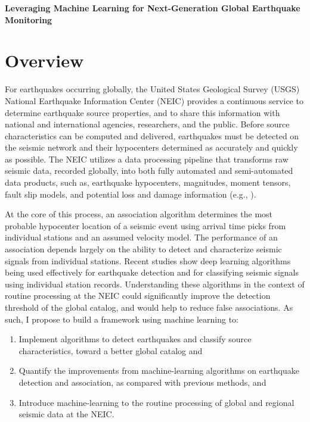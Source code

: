 \documentclass[12p]{article}
\begin{document}
\begin{center}\Large\textbf{Leveraging Machine Learning for Next-Generation Global Earthquake Monitoring}\end{center}

\section*{Overview}
For earthquakes occurring globally, the United States Geological Survey (USGS) National Earthquake Information Center (NEIC) provides a continuous service to determine earthquake source properties, and to share this information with national and international agencies, researchers, and the public. Before source characteristics can be computed and delivered, earthquakes must be detected on the seismic network and their hypocenters determined as accurately and quickly as possible. The NEIC utilizes a data processing pipeline that transforms raw seismic data, recorded globally, into both fully automated and semi-automated data products, such as, earthquake hypocenters, magnitudes, moment tensors, fault slip models, and potential loss and damage information (e.g., \citet{Thompson2019, Michael2019}).

At the core of this process, an association algorithm determines the most probable hypocenter location of a seismic event using arrival time picks from individual stations and an assumed velocity model. The performance of an association depends largely on the ability to detect and characterize seismic signals from individual stations. Recent  studies show deep learning algorithms being used effectively for earthquake detection and for classifying seismic signals using individual station records. Understanding these algorithms in the context of routine processing at the NEIC could significantly improve the detection threshold of the global catalog, and would help to reduce false associations. As such, I propose to build a framework using machine learning to:

\begin{enumerate}\bfseries
  \item Implement algorithms to detect earthquakes and classify source characteristics, toward a better global catalog and
  \item Quantify the improvements from machine-learning algorithms on earthquake detection and association, as compared with previous methods, and
  \item Introduce machine-learning to the routine processing of global and regional seismic data at the NEIC.
\end{enumerate}
\end{document}
